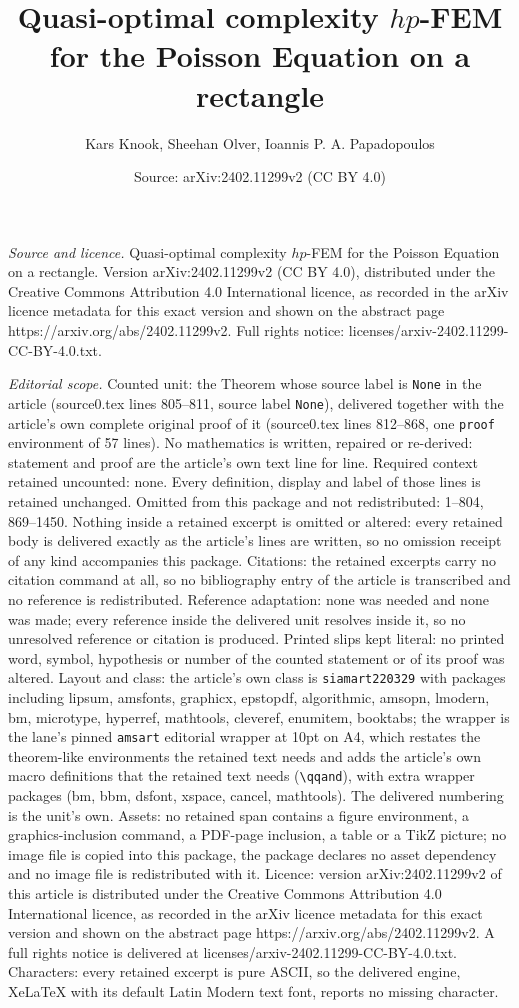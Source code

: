 \documentclass[10pt,a4paper]{amsart}
\title[Quasi-optimal complexity $hp$-FEM for the Poisson Equation o]{Quasi-optimal complexity $hp$-FEM for the Poisson Equation on a rectangle}
\author{Kars Knook, Sheehan Olver, Ioannis P. A. Papadopoulos}
\date{Source: arXiv:2402.11299v2 (CC BY 4.0)}
\begin{document}
\maketitle

\noindent\emph{Source and licence.} Quasi-optimal complexity $hp$-FEM for the Poisson Equation on a rectangle. Version arXiv:2402.11299v2 (CC BY 4.0), distributed under the Creative Commons Attribution 4.0 International licence, as recorded in the arXiv licence metadata for this exact version and shown on the abstract page https://arxiv.org/abs/2402.11299v2. Full rights notice: licenses/arxiv-2402.11299-CC-BY-4.0.txt.\par\smallskip

\noindent\textit{Editorial scope.} Counted unit: the Theorem whose source label is \texttt{None} in the article (source0.tex lines 805--811, source label \texttt{None}), delivered together with the article's own complete original proof of it (source0.tex lines 812--868, one \texttt{proof} environment of 57 lines). No mathematics is written, repaired or re-derived: statement and proof are the article's own text line for line. Required context retained uncounted: none. Every definition, display and label of those lines is retained unchanged. Omitted from this package and not redistributed: 1--804, 869--1450. Nothing inside a retained excerpt is omitted or altered: every retained body is delivered exactly as the article's lines are written, so no omission receipt of any kind accompanies this package. Citations: the retained excerpts carry no citation command at all, so no bibliography entry of the article is transcribed and no reference is redistributed. Reference adaptation: none was needed and none was made; every reference inside the delivered unit resolves inside it, so no unresolved reference or citation is produced. Printed slips kept literal: no printed word, symbol, hypothesis or number of the counted statement or of its proof was altered. Layout and class: the article's own class is \texttt{siamart220329} with packages including lipsum, amsfonts, graphicx, epstopdf, algorithmic, amsopn, lmodern, bm, microtype, hyperref, mathtools, cleveref, enumitem, booktabs; the wrapper is the lane's pinned \texttt{amsart} editorial wrapper at 10pt on A4, which restates the theorem-like environments the retained text needs and adds the article's own macro definitions that the retained text needs (\texttt{\textbackslash qqand}), with extra wrapper packages (bm, bbm, dsfont, xspace, cancel, mathtools). The delivered numbering is the unit's own. Assets: no retained span contains a figure environment, a graphics-inclusion command, a PDF-page inclusion, a table or a TikZ picture; no image file is copied into this package, the package declares no asset dependency and no image file is redistributed with it. Licence: version arXiv:2402.11299v2 of this article is distributed under the Creative Commons Attribution 4.0 International licence, as recorded in the arXiv licence metadata for this exact version and shown on the abstract page https://arxiv.org/abs/2402.11299v2. A full rights notice is delivered at licenses/arxiv-2402.11299-CC-BY-4.0.txt. Characters: every retained excerpt is pure ASCII, so the delivered engine, XeLaTeX with its default Latin Modern text font, reports no missing character.
\end{document}
